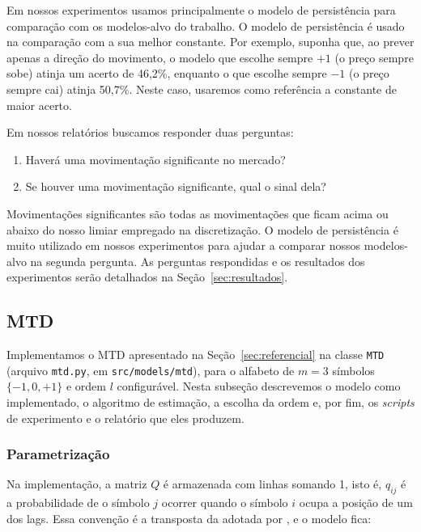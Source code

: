 \documentclass[
    12pt,                %
    openright,           %
    oneside,             %
    a4paper,             %
    english,             %
    brazil               %
]{abntex2}
\begin{document}
Em nossos experimentos usamos principalmente o modelo de persistência para comparação com os modelos-alvo do trabalho. O modelo de persistência
é usado na comparação com a sua melhor constante. Por exemplo, suponha que, ao prever apenas a direção do movimento, o modelo que
escolhe sempre $+1$ (o preço sempre sobe) atinja um acerto de 46,2\%, enquanto o que escolhe sempre $-1$ (o preço sempre cai)
atinja 50,7\%. Neste caso, usaremos como referência a constante de maior acerto.

Em nossos relatórios buscamos responder duas perguntas:

\begin{enumerate}
  \item Haverá uma movimentação significante no mercado? 
  \item Se houver uma movimentação significante, qual o sinal dela?
\end{enumerate}

Movimentações significantes são todas as movimentações que ficam acima ou abaixo do nosso limiar empregado na discretização. O modelo de persistência é muito 
utilizado em nossos experimentos para ajudar a comparar nossos modelos-alvo na segunda pergunta. As perguntas respondidas e os resultados dos experimentos serão 
detalhados na Seção~\ref{sec:resultados}.

\subsection{MTD}
\label{subsec:mtd_metodologia}

Implementamos o MTD apresentado na Seção~\ref{sec:referencial} na classe \texttt{MTD} (arquivo \texttt{mtd.py}, em \texttt{src/models/mtd}), para o alfabeto
de $m = 3$ símbolos $\{-1, 0, +1\}$ e ordem $l$ configurável. Nesta subseção descrevemos o modelo como implementado, o algoritmo de estimação, a escolha da
ordem e, por fim, os \textit{scripts} de experimento e o relatório que eles produzem.

\subsubsection{Parametrização}

Na implementação, a matriz $Q$ é armazenada com linhas somando 1, isto é, $q_{ij}$ é a probabilidade de o símbolo $j$ ocorrer quando o símbolo $i$
ocupa a posição de um dos lags. Essa convenção é a transposta da adotada por , e o modelo fica:
\end{document}
